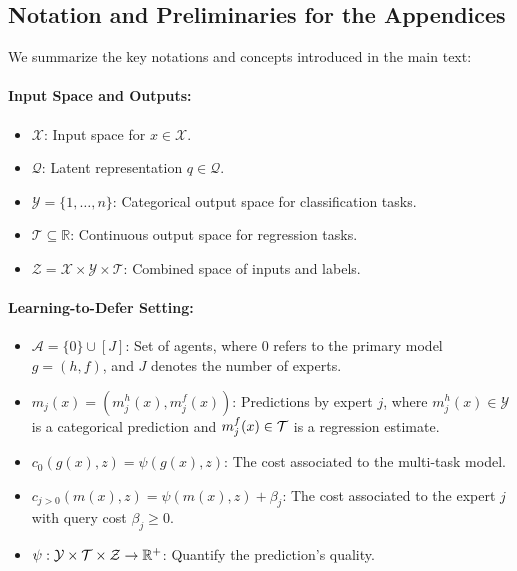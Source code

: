 \clearpage
\onecolumn
\begin{appendices}
\section{Notation and Preliminaries for the Appendices}

We summarize the key notations and concepts introduced in the main text:

\paragraph{Input Space and Outputs:}
\begin{itemize}
    \item \( \mathcal{X} \): Input space for \( x \in \mathcal{X} \).
    \item \( \mathcal{Q} \): Latent representation \( q \in \mathcal{Q} \).
    \item \( \mathcal{Y} = \{1, \dots, n\} \): Categorical output space for classification tasks.
    \item \( \mathcal{T} \subseteq \mathbb{R} \): Continuous output space for regression tasks.
    \item \( \mathcal{Z} = \mathcal{X} \times \mathcal{Y} \times \mathcal{T} \): Combined space of inputs and labels.
\end{itemize}


\paragraph{Learning-to-Defer Setting:}
\begin{itemize}
    \item \( \mathcal{A} = \{0\} \cup [J] \): Set of agents, where \( 0 \) refers to the primary model \( g = (h, f) \), and \( J \) denotes the number of experts.
    \item \( m_j(x) = (m_j^h(x), m_j^f(x)) \): Predictions by expert \( j \), where \( m_j^h(x) \in \mathcal{Y} \) is a categorical prediction and \( m_j^f(x) \in \mathcal{T} \) is a regression estimate.
    \item $c_0(g(x), z) = \psi(g(x),z)$: The cost associated to the multi-task model.
    \item $c_{j>0}(m(x), z) = \psi(m(x),z) + \beta_j$: The cost associated to the expert $j$ with query cost $\beta_j\geq0$.
    \item $\psi: \mathcal{Y}\times\mathcal{T}\times\mathcal{Z}\to\mathbb{R}^+$: Quantify the prediction's quality. 
\end{itemize}


\end{appendices}
